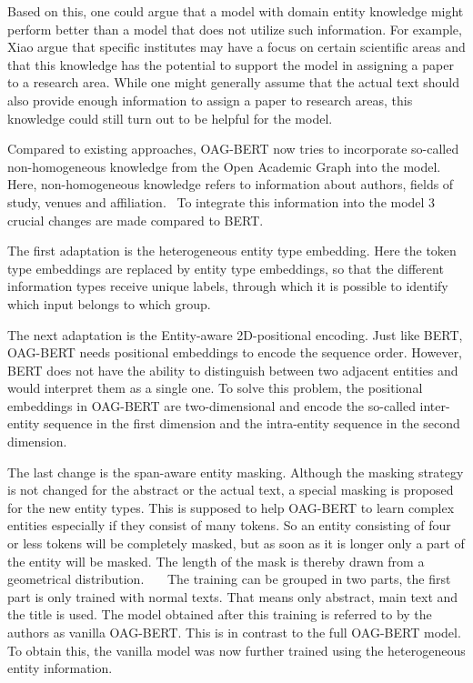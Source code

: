 	Based on this, one could argue that a model with domain entity knowledge might perform better than a model that does not utilize such information. For example, Xiao argue that specific institutes may have a focus on certain scientific areas and that this knowledge has the potential to support the model in assigning a paper to a research area. While one might generally assume that the actual text should also provide enough information to assign a paper to research areas, this knowledge could still turn out to be helpful for the model. 
	
	Compared to existing approaches, OAG-BERT now tries to incorporate so-called non-homogeneous knowledge from the Open Academic Graph into the model. Here, non-homogeneous knowledge refers to information about authors, fields of study, venues and affiliation. 
	To integrate this information into the model 3 crucial changes are made compared to BERT. 
	
	The first adaptation is the heterogeneous entity type embedding. Here the token type embeddings are replaced by entity type embeddings, so that the different information types receive unique labels, through which it is possible to identify which input belongs to which group.  
	
	The next adaptation is the Entity-aware 2D-positional encoding. Just like BERT, OAG-BERT needs positional embeddings to encode the sequence order. However, BERT does not have the ability to distinguish between two adjacent entities and would interpret them as a single one. To solve this problem, the positional embeddings in OAG-BERT are two-dimensional and encode the so-called inter-entity sequence in the first dimension and the intra-entity sequence in the second dimension.
	
	The last change is the span-aware entity masking. Although the masking strategy is not changed for the abstract or the actual text, a special masking is proposed for the new entity types. This is supposed to help OAG-BERT to learn complex entities especially if they consist of many tokens. So an entity consisting of four or less tokens will be completely masked, but as soon as it is longer only a part of the entity will be masked. The length of the mask is thereby drawn from a geometrical distribution.   
	The training can be grouped in two parts, the first part is only trained with normal texts. That means only abstract, main text and the title is used. The model obtained after this training is referred to by the authors as vanilla OAG-BERT. This is in contrast to the full OAG-BERT model. To obtain this, the vanilla model was now further trained using the heterogeneous entity information. 
	
